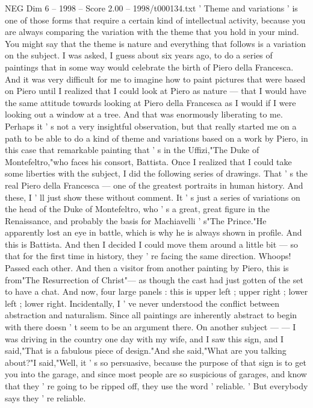 \begin{textsample}{NEG Dim 6 – 1998 – Score 2.00 – 1998/t000134.txt}  \label{ex:f6_neg_065}
' Theme and variations ' is one of those forms that require a certain kind of intellectual activity, because you are always comparing the variation with the theme that you hold in your mind.
You might say that the theme is nature and everything that follows is a variation on the subject.
I was asked, I guess about six years ago, to do a series of paintings that in some way would celebrate the birth of Piero della Francesca.
And it was very difficult for me to imagine how to paint pictures that were based on Piero until I realized that I could look at Piero as nature — that I would have the same attitude towards looking at Piero della Francesca as I would if I were looking out a window at a tree.
And that was enormously liberating to me.
Perhaps it ' s not a very insightful observation, but that really started me on a path to be able to do a kind of theme and variations based on a work by Piero, in this case that remarkable painting that ' s in the Uffizi,"The Duke of Montefeltro,"who faces his consort, Battista.
Once I realized that I could take some liberties with the subject, I did the following series of drawings.
That ' s the real Piero della Francesca — one of the greatest portraits in human history.
And these, I ' ll just show these without comment.
It ' s just a series of variations on the head of the Duke of Montefeltro, who ' s a great, great figure in the Renaissance, and probably the basis for Machiavelli ' s"The Prince."He apparently lost an eye in battle, which is why he is always shown in profile.
And this is Battista.
And then I decided I could move them around a little bit — so that for the first time in history, they ' re facing the same direction.
Whoops!
Passed each other.
And then a visitor from another painting by Piero, this is from"The Resurrection of Christ"— as though the cast had just gotten of the set to have a chat.
And now, four large panels : this is upper left ; upper right ; lower left ; lower right.
Incidentally, I ' ve never understood the conflict between abstraction and naturalism.
Since all paintings are inherently abstract to begin with there doesn ' t seem to be an argument there.
On another subject — — I was driving in the country one day with my wife, and I saw this sign, and I said,"That is a fabulous piece of design."And she said,"What are you talking about?"I said,"Well, it ' s so persuasive, because the purpose of that sign is to get you into the garage, and since most people are so suspicious of garages, and know that they ' re going to be ripped off, they use the word ' reliable. ' But everybody says they ' re reliable.

\end{textsample}
